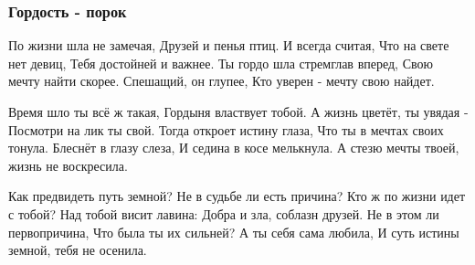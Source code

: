  
 
 

\subsubsection{Гордость - порок}
\label{sec:poetry.rus.sokor.gordost_porok}

По жизни шла не замечая,
Друзей и пенья птиц.
И всегда считая,
Что на свете нет девиц,
Тебя достойней и важнее.
Ты гордо шла стремглав вперед,
Свою мечту найти скорее.
Спешащий, он глупее,
Кто уверен - мечту свою найдет.

Время шло ты всё ж такая,
Гордыня властвует тобой.
А жизнь цветёт, ты увядая -
Посмотри на лик ты свой.
Тогда откроет истину глаза,
Что ты в мечтах своих тонула.
Блеснёт в глазу слеза,
И седина в косе мелькнула.
А стезю мечты твоей, жизнь не воскресила.

Как предвидеть путь земной?
Не в судьбе ли есть причина?
Кто ж по жизни идет с тобой?
Над тобой висит лавина:
Добра и зла, соблазн друзей.
Не в этом ли первопричина,
Что была ты их сильней?
А ты себя сама любила,
И суть истины земной, тебя не осенила.
